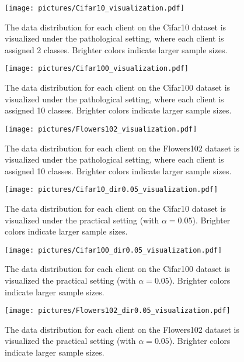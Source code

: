 \begin{figure}[ht]
    \centering
    \texttt{[image: pictures/Cifar10\_visualization.pdf]}
    \caption{The data distribution for each client on the Cifar10 dataset is visualized under the pathological setting, where each client is assigned 2 classes. Brighter colors indicate larger sample sizes.}
    \label{fig:Cifar10_visualization}
\end{figure}

\begin{figure}[ht]
    \centering
    \texttt{[image: pictures/Cifar100\_visualization.pdf]}
    \caption{The data distribution for each client on the Cifar100 dataset is visualized under the pathological setting, where each client is assigned 10 classes. Brighter colors indicate larger sample sizes.}
    \label{fig:Cifar100_visualization}
\end{figure}

\begin{figure}[ht]
    \centering
    \texttt{[image: pictures/Flowers102\_visualization.pdf]}
    \caption{The data distribution for each client on the Flowers102 dataset is visualized under the pathological setting, where each client is assigned 10 classes. Brighter colors indicate larger sample sizes.}
    \label{fig:Flowers102_visualization}
\end{figure}

\begin{figure}[ht]
    \centering
    \texttt{[image: pictures/Cifar10\_dir0.05\_visualization.pdf]}
    \caption{The data distribution for each client on the Cifar10 dataset is visualized under the practical setting (with $\alpha = 0.05$). Brighter colors indicate larger sample sizes.}
    \label{fig:Cifar10_dir0.05_visualization}
\end{figure}

\begin{figure}[ht]
    \centering
    \texttt{[image: pictures/Cifar100\_dir0.05\_visualization.pdf]}
    \caption{The data distribution for each client on the Cifar100 dataset is visualized the practical setting (with $\alpha = 0.05$). Brighter colors indicate larger sample sizes.}
    \label{fig:Cifar100_dir0.05_visualization}
\end{figure}

\begin{figure}[ht]
    \centering
    \texttt{[image: pictures/Flowers102\_dir0.05\_visualization.pdf]}
    \caption{The data distribution for each client on the Flowers102 dataset is visualized the practical setting (with $\alpha = 0.05$). Brighter colors indicate larger sample sizes.}
    \label{fig:Flowers102_dir0.05_visualization}
\end{figure}

